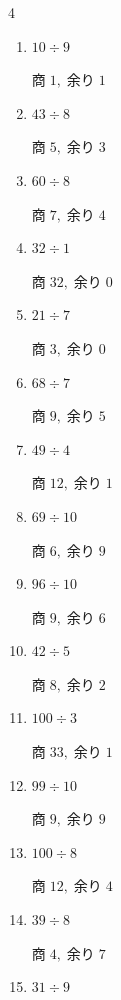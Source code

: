 \begin{multicols}{4}
\begin{enumerate}
        $商\; 13,\; 余り\; 0$

  \item $10 \div 9$

        $商\; 1,\; 余り\; 1$

  \item $43 \div 8$

        $商\; 5,\; 余り\; 3$

  \item $60 \div 8$

        $商\; 7,\; 余り\; 4$

  \item $32 \div 1$

        $商\; 32,\; 余り\; 0$

  \item $21 \div 7$

        $商\; 3,\; 余り\; 0$

  \item $68 \div 7$

        $商\; 9,\; 余り\; 5$

  \item $49 \div 4$

        $商\; 12,\; 余り\; 1$

  \item $69 \div 10$

        $商\; 6,\; 余り\; 9$

  \item $96 \div 10$

        $商\; 9,\; 余り\; 6$

  \item $42 \div 5$

        $商\; 8,\; 余り\; 2$

  \item $100 \div 3$

        $商\; 33,\; 余り\; 1$

  \item $99 \div 10$

        $商\; 9,\; 余り\; 9$

\columnbreak %

  \item $100 \div 8$

        $商\; 12,\; 余り\; 4$

  \item $39 \div 8$

        $商\; 4,\; 余り\; 7$

  \item $31 \div 9$


\end{enumerate}
\end{multicols}
